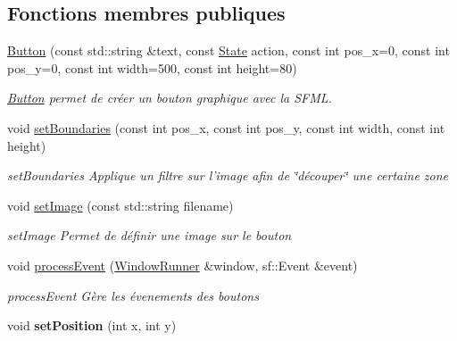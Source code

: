 \subsection*{Fonctions membres publiques}
\begin{DoxyCompactItemize}
\item 
\hyperlink{class_button_ad8dae1505b6418a5f81829503e3b9dc7}{Button} (const std\+::string \&text, const \hyperlink{gamestate_8h_a5d74787dedbc4e11c1ab15bf487e61f8}{State} action, const int pos\+\_\+x=0, const int pos\+\_\+y=0, const int width=500, const int height=80)
\begin{DoxyCompactList}\small\item\em \hyperlink{class_button}{Button} permet de créer un bouton graphique avec la S\+F\+M\+L. \end{DoxyCompactList}\item 
\hypertarget{class_button_a9ee0da19612c994fd4f92a88311a9d90}{void \hyperlink{class_button_a9ee0da19612c994fd4f92a88311a9d90}{set\+Boundaries} (const int pos\+\_\+x, const int pos\+\_\+y, const int width, const int height)}\label{class_button_a9ee0da19612c994fd4f92a88311a9d90}

\begin{DoxyCompactList}\small\item\em set\+Boundaries Applique un filtre sur l'image afin de \char`\"{}découper\char`\"{} une certaine zone \end{DoxyCompactList}\item 
void \hyperlink{class_button_a71c5cc7c8916f46949c427771f45feab}{set\+Image} (const std\+::string filename)
\begin{DoxyCompactList}\small\item\em set\+Image Permet de définir une image sur le bouton \end{DoxyCompactList}\item 
\hypertarget{class_button_a1730b67ffa2c2b179b47c206770247f3}{void \hyperlink{class_button_a1730b67ffa2c2b179b47c206770247f3}{process\+Event} (\hyperlink{class_window_runner}{Window\+Runner} \&window, sf\+::\+Event \&event)}\label{class_button_a1730b67ffa2c2b179b47c206770247f3}

\begin{DoxyCompactList}\small\item\em process\+Event Gère les évenements des boutons \end{DoxyCompactList}\item 
\hypertarget{class_button_ab6b733217aabf3efa8df58145949fd7c}{void {\bfseries set\+Position} (int x, int y)}\label{class_button_ab6b733217aabf3efa8df58145949fd7c}


\end{DoxyCompactItemize}
